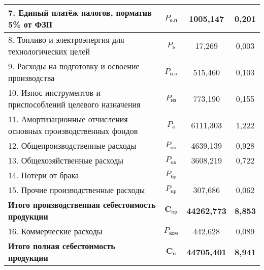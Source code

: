 {\begin{longtable}{| m{10.7cm} | c | c | c |}
      7. Единый платёж налогов, норматив 5\% от ФЗП
      & \( P_{\text{е.п}} \) & 1005{,}147 & 0{,}201 \\
      \hline

      8. Топливо и электроэнергия для технологических целей
      & \( P_{\text{э}} \) & 17{,}269 & 0{,}003 \\
      \hline

      9. Расходы на подготовку и освоение производства
      & \( P_{\text{п.о}} \) & 515{,}460 & 0{,}103 \\
      \hline

      10. Износ инструментов и приспособлений \newline
      целевого назначения
      & \( P_{\text{из}} \) & 773{,}190 & 0{,}155 \\
      \hline

      11. Амортизационные отчисления основных \newline 
      производственных фондов
      & \( P_{\text{а}} \) & 6111{,}303 & 1{,}222 \\
      \hline

      12. Общепроизводственные расходы
      & \( P_{\text{оп}} \) & 4639{,}139 & 0{,}928 \\
      \hline

      13. Общехозяйственные расходы
      & \( P_{\text{ох}} \) & 3608{,}219 & 0{,}722 \\
      \hline

      14. Потери от брака
      & \( P_{\text{бр}} \) & -- & -- \\
      \hline

      15. Прочие производственные расходы
      & \( P_{\text{пр}} \) & 307{,}686 & 0{,}062 \\
      \hline

      \textbf{Итого \newline производственная себестоимость продукции}
      & \( \mathbf{C_{\text{пр}}} \) & \textbf{44262{,}773} & \textbf{8{,}853} \\
      \hline

      16. Коммерческие расходы
      & \( P_{\text{ком}} \) & 442{,}628 & 0{,}089 \\
      \hline

      \textbf{Итого \newline полная себестоимость продукции}
      & \( \mathbf{C_{\text{п}}} \) & \textbf{44705{,}401} & \textbf{8{,}941} \\
      \hline


\end{longtable}}
